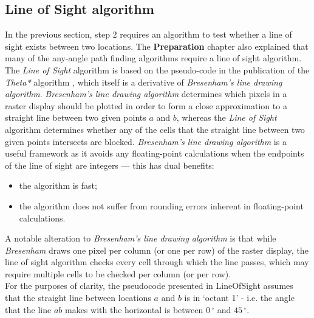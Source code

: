 \documentclass[12pt,notitlepage]{report}
\begin{document}
\subsection{Line of Sight algorithm}
In the previous section, step 2 requires an algorithm to test whether a line of sight exists between two locations. The {\bfseries Preparation} chapter also explained that many of the any-angle path finding algorithms require a line of sight algorithm.\\

\noindent
The {\em Line of Sight} algorithm is based on the pseudo-code in the publication of the {\em Theta*} algorithm \cite{Daniel10}, which itself is a derivative of {\em Bresenham's line drawing algorithm}\cite{Bresenham65}. {\em Bresenham's line drawing algorithm} determines which pixels in a raster display should be plotted in order to form a close approximation to a straight line between two given points $a$ and $b$, whereas the {\em Line of Sight} algorithm determines whether any of the cells that the straight line between two given points intersects are blocked. {\em Bresenham's line drawing algorithm} is a useful framework as it avoids any floating-point calculations when the endpoints of the line of sight are integers --- this has dual benefits:
\begin{itemize}
\item the algorithm is fast;
\item the algorithm does not suffer from rounding errors inherent in floating-point calculations. 
\end{itemize}
\noindent
A notable alteration to {\em Bresenham's line drawing algorithm} is that while {\em Bresenham} draws one pixel per column (or one per row) of the raster display, the line of sight algorithm checks every cell through which the line passes, which may require multiple cells to be checked per column (or per row).\\

\noindent
For the purposes of clarity, the pseudocode presented in {\sc LineOfSight} assumes that the straight line between locations $a$ and $b$ is in `octant 1' - i.e. the angle that the line $ab$ makes with the horizontal is between $0\,^{\circ}$ and $45\,^{\circ}$.\\
\end{document}
